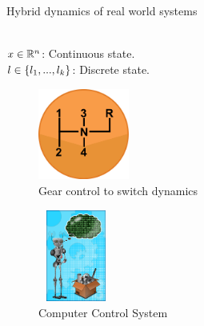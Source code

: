 \begin{frame}{Hybrid dynamics of real world systems}
\begin{minipage}{0.45\textwidth}
\begin{tikzpicture}[scale =0.8,
location/.style = {circle, draw=red!60, thick, fill = cyan!5}, 
]
\end{tikzpicture}\\[0.5em]
%
$x\in\reals^n$: Continuous state.\\
$l\in\set{l_1,...,l_k}$: Discrete state.
\end{minipage}

\begin{minipage}{0.45\textwidth}
\begin{figure}
\center
\includegraphics[width = 3cm, height = 3cm]{figures/downloaded/CarGear.png}
\caption{\small Gear control to switch dynamics}
\end{figure}
\end{minipage}
%
\begin{minipage}{0.45\textwidth}
\begin{figure}
\includegraphics[height = 3cm, width = 2.5cm]{figures/downloaded/ComputerControl.jpg}
\caption{\small Computer Control System}
\end{figure}
\end{minipage}

\end{frame}



